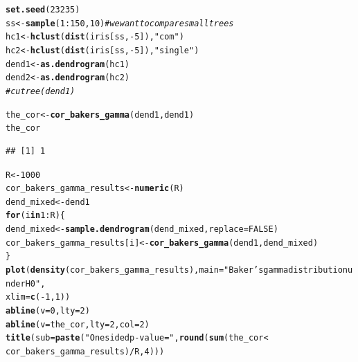 \documentclass[shortnames,nojss,article]{jss}\usepackage[]{graphicx}\usepackage[]{color}
\makeatletter
\newcommand{\hlnum}[1]{\textcolor[rgb]{0.686,0.059,0.569}{#1}}%
\newcommand{\hlstr}[1]{\textcolor[rgb]{0.192,0.494,0.8}{#1}}%
\newcommand{\hlcom}[1]{\textcolor[rgb]{0.678,0.584,0.686}{\textit{#1}}}%
\newcommand{\hlopt}[1]{\textcolor[rgb]{0,0,0}{#1}}%
\newcommand{\hlstd}[1]{\textcolor[rgb]{0.345,0.345,0.345}{#1}}%
\newcommand{\hlkwa}[1]{\textcolor[rgb]{0.161,0.373,0.58}{\textbf{#1}}}%
\newcommand{\hlkwb}[1]{\textcolor[rgb]{0.69,0.353,0.396}{#1}}%
\newcommand{\hlkwc}[1]{\textcolor[rgb]{0.333,0.667,0.333}{#1}}%
\newcommand{\hlkwd}[1]{\textcolor[rgb]{0.737,0.353,0.396}{\textbf{#1}}}%
\newenvironment{kframe}{%
 \def\at@end@of@kframe{}%
 \ifinner\ifhmode%
  \def\at@end@of@kframe{\end{minipage}}%
  \begin{minipage}{\columnwidth}%
 \fi\fi%
 \def\FrameCommand##1{\hskip\@totalleftmargin \hskip-\fboxsep
 \colorbox{shadecolor}{##1}\hskip-\fboxsep
     \hskip-\linewidth \hskip-\@totalleftmargin \hskip\columnwidth}%
 \MakeFramed {\advance\hsize-\width
   \@totalleftmargin\z@ \linewidth\hsize
   \@setminipage}}%
 {\par\unskip\endMakeFramed%
 \at@end@of@kframe}
\newenvironment{knitrout}{}{} %
\makeatother
\begin{document}
\begin{knitrout}
\color{fgcolor}\begin{kframe}
\begin{alltt}
\hlkwd{set.seed}\hlstd{(}\hlnum{23235}\hlstd{)}
\hlstd{ss} \hlkwb{<-} \hlkwd{sample}\hlstd{(}\hlnum{1}\hlopt{:}\hlnum{150}\hlstd{,} \hlnum{10}\hlstd{)}  \hlcom{# we want to compare small trees}
\hlstd{hc1} \hlkwb{<-} \hlkwd{hclust}\hlstd{(}\hlkwd{dist}\hlstd{(iris[ss,} \hlopt{-}\hlnum{5}\hlstd{]),} \hlstr{"com"}\hlstd{)}
\hlstd{hc2} \hlkwb{<-} \hlkwd{hclust}\hlstd{(}\hlkwd{dist}\hlstd{(iris[ss,} \hlopt{-}\hlnum{5}\hlstd{]),} \hlstr{"single"}\hlstd{)}
\hlstd{dend1} \hlkwb{<-} \hlkwd{as.dendrogram}\hlstd{(hc1)}
\hlstd{dend2} \hlkwb{<-} \hlkwd{as.dendrogram}\hlstd{(hc2)}
\hlcom{# cutree(dend1)}

\hlstd{the_cor} \hlkwb{<-} \hlkwd{cor_bakers_gamma}\hlstd{(dend1, dend1)}
\hlstd{the_cor}
\end{alltt}
\begin{verbatim}
## [1] 1
\end{verbatim}
\begin{alltt}
\hlstd{R} \hlkwb{<-} \hlnum{1000}
\hlstd{cor_bakers_gamma_results} \hlkwb{<-} \hlkwd{numeric}\hlstd{(R)}
\hlstd{dend_mixed} \hlkwb{<-} \hlstd{dend1}
\hlkwa{for} \hlstd{(i} \hlkwa{in} \hlnum{1}\hlopt{:}\hlstd{R) \{}
    \hlstd{dend_mixed} \hlkwb{<-} \hlkwd{sample.dendrogram}\hlstd{(dend_mixed,} \hlkwc{replace} \hlstd{=} \hlnum{FALSE}\hlstd{)}
    \hlstd{cor_bakers_gamma_results[i]} \hlkwb{<-} \hlkwd{cor_bakers_gamma}\hlstd{(dend1, dend_mixed)}
\hlstd{\}}
\hlkwd{plot}\hlstd{(}\hlkwd{density}\hlstd{(cor_bakers_gamma_results),} \hlkwc{main} \hlstd{=} \hlstr{"Baker's gamma distribution under H0"}\hlstd{,}
    \hlkwc{xlim} \hlstd{=} \hlkwd{c}\hlstd{(}\hlopt{-}\hlnum{1}\hlstd{,} \hlnum{1}\hlstd{))}
\hlkwd{abline}\hlstd{(}\hlkwc{v} \hlstd{=} \hlnum{0}\hlstd{,} \hlkwc{lty} \hlstd{=} \hlnum{2}\hlstd{)}
\hlkwd{abline}\hlstd{(}\hlkwc{v} \hlstd{= the_cor,} \hlkwc{lty} \hlstd{=} \hlnum{2}\hlstd{,} \hlkwc{col} \hlstd{=} \hlnum{2}\hlstd{)}
\hlkwd{title}\hlstd{(}\hlkwc{sub} \hlstd{=} \hlkwd{paste}\hlstd{(}\hlstr{"One sided p-value ="}\hlstd{,} \hlkwd{round}\hlstd{(}\hlkwd{sum}\hlstd{(the_cor} \hlopt{<}
    \hlstd{cor_bakers_gamma_results)}\hlopt{/}\hlstd{R,} \hlnum{4}\hlstd{)))}
\end{alltt}
\end{kframe}


\end{knitrout}
\end{document}
